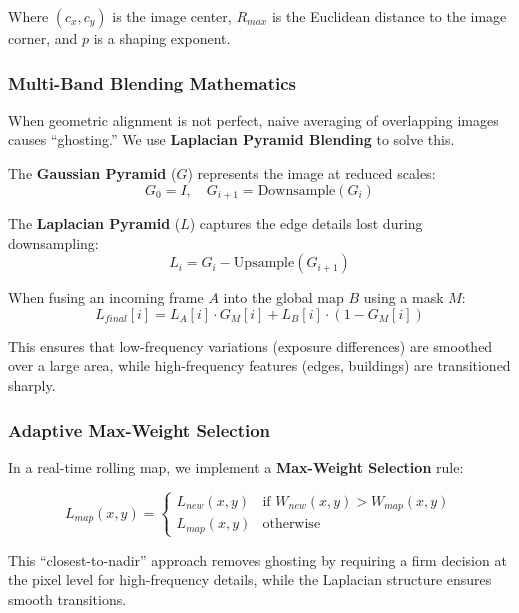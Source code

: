 \documentclass[conference]{IEEEtran}
\begin{document}
\noindent Where $(c_x, c_y)$ is the image center, $R_{max}$ is the Euclidean distance to the image corner, and $p$ is a shaping exponent.

\subsubsection{Multi-Band Blending Mathematics}
When geometric alignment is not perfect, naive averaging of overlapping images causes ``ghosting.'' We use \textbf{Laplacian Pyramid Blending} \cite{burt1983laplacian} to solve this.

The \textbf{Gaussian Pyramid} ($G$) represents the image at reduced scales:
\begin{equation}
G_0 = I, \quad G_{i+1} = \text{Downsample}(G_i)
\end{equation}

The \textbf{Laplacian Pyramid} ($L$) captures the edge details lost during downsampling:
\begin{equation}
L_i = G_i - \text{Upsample}(G_{i+1})
\end{equation}

When fusing an incoming frame $A$ into the global map $B$ using a mask $M$:
\begin{equation}
L_{final}[i] = L_A[i] \cdot G_M[i] + L_B[i] \cdot (1 - G_M[i])
\end{equation}

This ensures that low-frequency variations (exposure differences) are smoothed over a large area, while high-frequency features (edges, buildings) are transitioned sharply.

\subsubsection{Adaptive Max-Weight Selection}
In a real-time rolling map, we implement a \textbf{Max-Weight Selection} rule:

\begin{equation} \label{eq:max_weight}
L_{map}(x, y) = \begin{cases}
L_{new}(x, y) & \text{if } W_{new}(x, y) > W_{map}(x, y) \\
L_{map}(x, y) & \text{otherwise}
\end{cases}
\end{equation}

This ``closest-to-nadir'' approach removes ghosting by requiring a firm decision at the pixel level for high-frequency details, while the Laplacian structure ensures smooth transitions.
\end{document}
